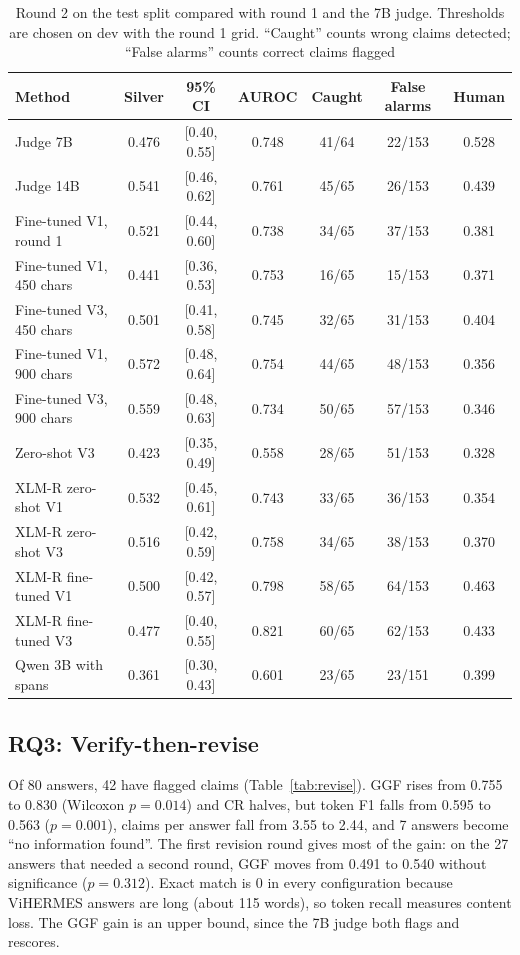 \documentclass[conference]{IEEEtran}
\begin{document}
\begin{table}[t]
\caption{Round 2 on the test split compared with round 1 and the 7B judge. Thresholds are chosen on dev with the round 1 grid. ``Caught'' counts wrong claims detected; ``False alarms'' counts correct claims flagged}
\label{tab:round2}
\centering
\footnotesize
\begin{tabular}{lcccccc}
\toprule
Method & Silver & 95\% CI & AUROC & Caught & False alarms & Human \\
\midrule
Judge 7B & 0.476 & [0.40, 0.55] & 0.748 & 41/64 & 22/153 & 0.528 \\
Judge 14B & 0.541 & [0.46, 0.62] & 0.761 & 45/65 & 26/153 & 0.439 \\
Fine-tuned V1, round 1 & 0.521 & [0.44, 0.60] & 0.738 & 34/65 & 37/153 & 0.381 \\
Fine-tuned V1, 450 chars & 0.441 & [0.36, 0.53] & 0.753 & 16/65 & 15/153 & 0.371 \\
Fine-tuned V3, 450 chars & 0.501 & [0.41, 0.58] & 0.745 & 32/65 & 31/153 & 0.404 \\
Fine-tuned V1, 900 chars & 0.572 & [0.48, 0.64] & 0.754 & 44/65 & 48/153 & 0.356 \\
Fine-tuned V3, 900 chars & 0.559 & [0.48, 0.63] & 0.734 & 50/65 & 57/153 & 0.346 \\
Zero-shot V3 & 0.423 & [0.35, 0.49] & 0.558 & 28/65 & 51/153 & 0.328 \\
XLM-R zero-shot V1 & 0.532 & [0.45, 0.61] & 0.743 & 33/65 & 36/153 & 0.354 \\
XLM-R zero-shot V3 & 0.516 & [0.42, 0.59] & 0.758 & 34/65 & 38/153 & 0.370 \\
XLM-R fine-tuned V1 & 0.500 & [0.42, 0.57] & 0.798 & 58/65 & 64/153 & 0.463 \\
XLM-R fine-tuned V3 & 0.477 & [0.40, 0.55] & 0.821 & 60/65 & 62/153 & 0.433 \\
Qwen 3B with spans & 0.361 & [0.30, 0.43] & 0.601 & 23/65 & 23/151 & 0.399 \\
\bottomrule
\end{tabular}
\end{table}

\subsection{RQ3: Verify-then-revise}
Of 80 answers, 42 have flagged claims (Table~\ref{tab:revise}). GGF rises from 0.755 to 0.830 (Wilcoxon $p=0.014$) and CR halves, but token F1 falls from 0.595 to 0.563 ($p=0.001$), claims per answer fall from 3.55 to 2.44, and 7 answers become ``no information found''. The first revision round gives most of the gain: on the 27 answers that needed a second round, GGF moves from 0.491 to 0.540 without significance ($p=0.312$). Exact match is 0 in every configuration because ViHERMES answers are long (about 115 words), so token recall measures content loss. The GGF gain is an upper bound, since the 7B judge both flags and rescores.
\end{document}
